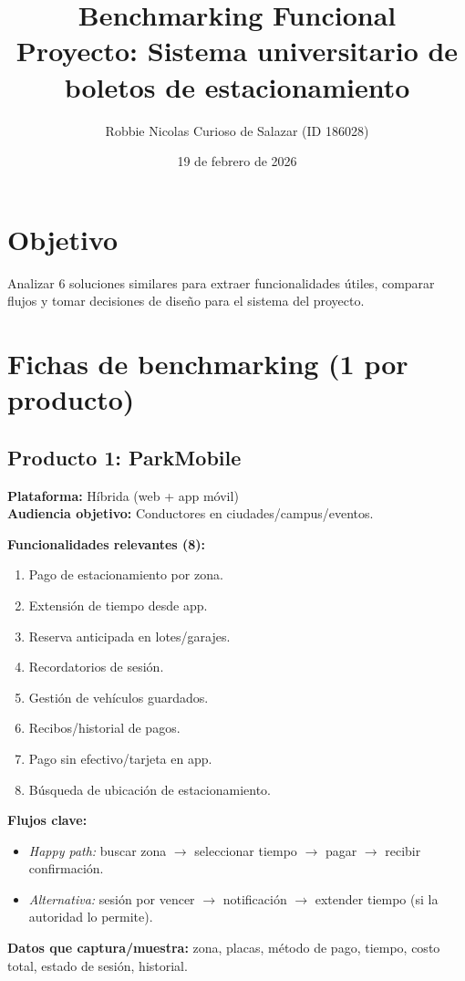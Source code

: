 \documentclass[11pt]{article}
\title{Benchmarking Funcional\\Proyecto: Sistema universitario de boletos de estacionamiento}
\author{Robbie Nicolas Curioso de Salazar (ID 186028)}
\date{19 de febrero de 2026}
\begin{document}
\maketitle

\section*{Objetivo}
Analizar 6 soluciones similares para extraer funcionalidades útiles, comparar flujos y tomar decisiones de diseño para el sistema del proyecto.

\section{Fichas de benchmarking (1 por producto)}

\subsection{Producto 1: ParkMobile}
\textbf{Plataforma:} Híbrida (web + app móvil)\\
\textbf{Audiencia objetivo:} Conductores en ciudades/campus/eventos.

\textbf{Funcionalidades relevantes (8):}
\begin{enumerate}
\item Pago de estacionamiento por zona.
\item Extensión de tiempo desde app.
\item Reserva anticipada en lotes/garajes.
\item Recordatorios de sesión.
\item Gestión de vehículos guardados.
\item Recibos/historial de pagos.
\item Pago sin efectivo/tarjeta en app.
\item Búsqueda de ubicación de estacionamiento.
\end{enumerate}

\textbf{Flujos clave:}
\begin{itemize}
\item \textit{Happy path:} buscar zona $\rightarrow$ seleccionar tiempo $\rightarrow$ pagar $\rightarrow$ recibir confirmación.
\item \textit{Alternativa:} sesión por vencer $\rightarrow$ notificación $\rightarrow$ extender tiempo (si la autoridad lo permite).
\end{itemize}

\textbf{Datos que captura/muestra:} zona, placas, método de pago, tiempo, costo total, estado de sesión, historial.
\end{document}
